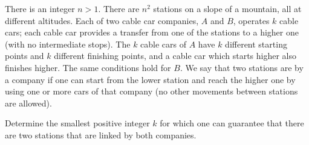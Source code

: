 There is an integer $n>1$. There are $n^2$ stations on a slope of a mountain, all at different altitudes. Each of two cable car companies, $A$ and $B$, operates $k$ cable cars; each cable car provides a transfer from one of the stations to a higher one (with no intermediate stops). The $k$ cable cars of $A$ have $k$ different starting points and $k$ different finishing points, and a cable car which starts higher also finishes higher. The same conditions hold for $B$. We say that two stations are  by a company if one can start from the lower station and reach the higher one by using one or more cars of that company (no other movements between stations are allowed).

Determine the smallest positive integer $k$ for which one can guarantee that there are two stations that are linked by both companies.
